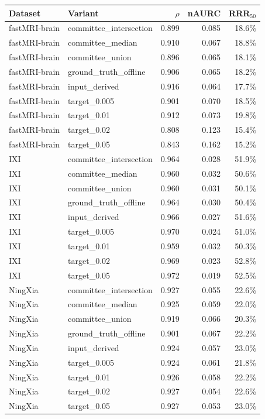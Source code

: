 \begin{tabular}{llrrr}
\toprule
Dataset & Variant & $\rho$ & nAURC & RRR$_{50}$ \\
\midrule
fastMRI-brain & committee\_intersection & 0.899 & 0.085 & 18.6\% \\
fastMRI-brain & committee\_median & 0.910 & 0.067 & 18.8\% \\
fastMRI-brain & committee\_union & 0.896 & 0.065 & 18.1\% \\
fastMRI-brain & ground\_truth\_offline & 0.906 & 0.065 & 18.2\% \\
fastMRI-brain & input\_derived & 0.916 & 0.064 & 17.7\% \\
fastMRI-brain & target\_0.005 & 0.901 & 0.070 & 18.5\% \\
fastMRI-brain & target\_0.01 & 0.912 & 0.073 & 19.8\% \\
fastMRI-brain & target\_0.02 & 0.808 & 0.123 & 15.4\% \\
fastMRI-brain & target\_0.05 & 0.843 & 0.162 & 15.2\% \\
IXI & committee\_intersection & 0.964 & 0.028 & 51.9\% \\
IXI & committee\_median & 0.960 & 0.032 & 50.6\% \\
IXI & committee\_union & 0.960 & 0.031 & 50.1\% \\
IXI & ground\_truth\_offline & 0.964 & 0.030 & 50.4\% \\
IXI & input\_derived & 0.966 & 0.027 & 51.6\% \\
IXI & target\_0.005 & 0.970 & 0.024 & 51.0\% \\
IXI & target\_0.01 & 0.959 & 0.032 & 50.3\% \\
IXI & target\_0.02 & 0.969 & 0.023 & 52.8\% \\
IXI & target\_0.05 & 0.972 & 0.019 & 52.5\% \\
NingXia & committee\_intersection & 0.927 & 0.055 & 22.6\% \\
NingXia & committee\_median & 0.925 & 0.059 & 22.0\% \\
NingXia & committee\_union & 0.919 & 0.066 & 20.3\% \\
NingXia & ground\_truth\_offline & 0.901 & 0.067 & 22.2\% \\
NingXia & input\_derived & 0.924 & 0.057 & 23.0\% \\
NingXia & target\_0.005 & 0.924 & 0.061 & 21.8\% \\
NingXia & target\_0.01 & 0.926 & 0.058 & 22.2\% \\
NingXia & target\_0.02 & 0.927 & 0.054 & 22.6\% \\
NingXia & target\_0.05 & 0.927 & 0.053 & 23.0\% \\
\bottomrule
\end{tabular}
